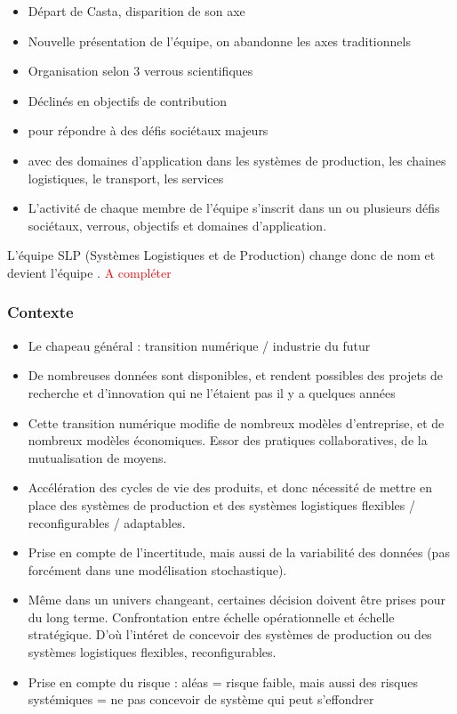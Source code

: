 		
		\begin{itemize}
		    \item Départ de Casta, disparition de son axe
		    \item Nouvelle présentation de l'équipe, on abandonne les axes traditionnels
		    \item Organisation selon 3 verrous scientifiques 
		    \item Déclinés en objectifs de contribution
		    \item pour répondre à des défis sociétaux majeurs
		    \item avec des domaines d'application dans les systèmes de production, les chaines logistiques, le transport, les services
		    \item L'activité de chaque membre de l'équipe s'inscrit dans un ou plusieurs défis sociétaux, verrous, objectifs et domaines d'application. 
		\end{itemize}
		
		L'équipe SLP (Systèmes Logistiques et de Production) change donc de nom et devient l'équipe \slp. \textcolor{red}{A compléter}
		
		
		
		\subsubsection{Contexte}
		
		
			\begin{itemize}
		    \item Le chapeau général : transition numérique / industrie du futur
		    \item De nombreuses données sont disponibles, et rendent possibles des projets de recherche et d'innovation qui ne l'étaient pas il y a quelques années
		    \item Cette transition numérique modifie de nombreux modèles d'entreprise, et de nombreux modèles économiques. Essor des pratiques collaboratives, de la mutualisation de moyens.
		    \item Accélération des cycles de vie des produits, et donc nécessité de mettre en place des systèmes de production et des systèmes logistiques flexibles / reconfigurables / adaptables. 
		    \item Prise en compte de l'incertitude, mais aussi de la variabilité des données (pas forcément dans une modélisation stochastique).
		    \item Même dans un univers changeant, certaines décision doivent être prises pour du long terme. Confrontation entre échelle opérationnelle et échelle stratégique. D'où l'intéret de concevoir des systèmes de production ou des systèmes logistiques flexibles, reconfigurables. 
		    \item Prise en compte du risque : aléas = risque faible, mais aussi des risques systémiques = ne pas concevoir de système qui peut s'effondrer
		\end{itemize}
		
